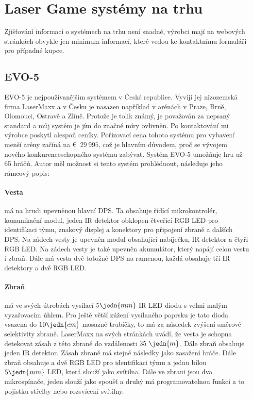 \section{Laser Game systémy na trhu}
Zjišťování informací o systémech na trhu není snadné, výrobci mají na webových stránkách obvykle jen minimum informací, které vedou ke kontaktnímu formuláři pro případné kupce.

\subsection{EVO-5}

EVO-5 je nejpoužívanějším  systémem v České republice. Vyvíjí jej nizozemská firma LaserMaxx a v Česku je nasazen například v arénách v Praze, Brně, Olomouci, Ostravě a Zlíně. Protože je tolik známý, je považován za nepsaný standard a můj systém je jím do značné míry ovlivněn. Po kontaktování mi výrobce poskytl alespoň ceníky. Pořizovací cena tohoto systému pro vybavení menší arény začíná na €~$29~995$, což je hlavním důvodem, proč se vývojem nového konkurenceschopného systému zabývat. Systém EVO-5 umožňuje hru až 65 hráčů. Autor měl možnost si tento systém prohlédnout, následuje jeho rámcový popis:

\paragraph{Vesta}
má na hrudi upevněnou hlavní DPS. Ta obsahuje řídící mikrokontrolér, komunikační  modul, jeden IR detektor obklopen čtveřicí RGB LED pro identifikaci týmu, znakový displej a konektory pro připojení zbraně a dalších DPS. Na zádech vesty je upevněn modul obsahující nabíječku, IR detektor a čtyři RGB LED. Na zádech vesty je také upevněn akumulátor, který napájí celou vestu i zbraň. Dále má vesta dvě totožné DPS na ramenou, každá obsahuje tři IR detektory a dvě RGB LED.

\paragraph{Zbraň}
má ve svých útrobách vysílací $5\jedn{mm}$ IR LED diodu s velmi malým vyzařovacím úhlem. Pro ještě větší zúžení vysílaného paprsku je tato dioda vsazena do $10\jedn{cm}$ mosazné trubičky, to má za následek zvýšení směrové selektivity zbraně. LaserMaxx na svých stránkách uvádí, že vesta je schopna detekovat zásah z této zbraně do vzdálenosti $35~\jedn{m}$. Dále zbraň obsahuje jeden IR detektor. Zásah zbraně má stejné následky jako zasažení hráče. Dále zbraň obsahuje a dvě RGB LED pro identifikaci týmu a jednu bílou $5\jedn{mm}$ LED, která slouží jako svítilna. Dále ve zbrani jsou dva mikrospínače, jeden slouží jako spoušť a druhý má programovatelnou funkci a to pojistku střelby nebo rozsvícení svítilny.

